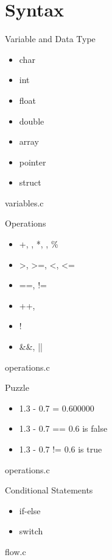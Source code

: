 \documentclass[UTF8]{beamer}
\begin{document}
\section{Syntax}
\begin{frame}[t]{Variable and Data Type}
    \begin{itemize}
        \item char
        \item int
        \item float
        \item double
        \item array
        \item pointer
        \item struct
    \end{itemize}
    variables.c
\end{frame}

\begin{frame}[t]{Operations}
    \begin{itemize}
        \item +, \-, *, \/, \%
        \item >, >=, <, <=
        \item ==, !=
        \item ++, \-\-
        \item !
        \item \&\&, ||
    \end{itemize}
    operations.c
\end{frame}

\begin{frame}[t]{Puzzle}
    \begin{itemize}
        \item 1.3 - 0.7 = 0.600000
        \item 1.3 - 0.7 == 0.6 is false
        \item 1.3 - 0.7 != 0.6 is true
    \end{itemize}
    operations.c
\end{frame}

\begin{frame}[t]{Conditional Statements}
    \begin{itemize}
        \item if-else
        \item switch
    \end{itemize}
    flow.c
\end{frame}
\end{document}
